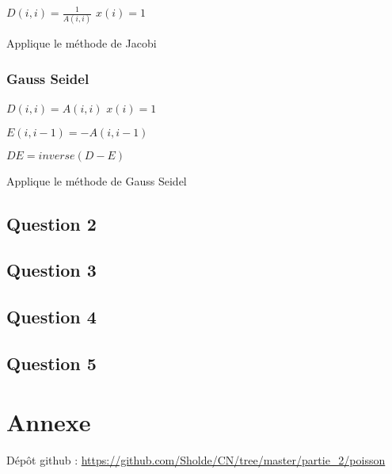 \documentclass[11pt]{article}
\DeclarePairedDelimiter{\norm}{\lVert}{\rVert}
\begin{document}
\begin{algorithm} [H]
  \SetAlgoLined
  
   {
    $D(i,i) = \frac{1}{A(i, i)}$\;
    $x(i) = 1$\;
  }
  

  \caption{Applique le méthode de Jacobi}
\end{algorithm}

\subsubsection{Gauss Seidel}

\begin{algorithm} [H]
  \SetAlgoLined
  
   {
    $D(i,i) = A(i, i)$\;
    $x(i) = 1$\;
  }

   {
    $E(i,i - 1) = - A(i, i - 1)$\;
  }

  $DE = inverse(D - E)$\; 


  \caption{Applique le méthode de Gauss Seidel}
\end{algorithm}

\subsection{Question 2}

\subsection{Question 3}

\subsection{Question 4}

\subsection{Question 5}

\section{Annexe}

Dépôt github : \url{https://github.com/Sholde/CN/tree/master/partie_2/poisson}
\end{document}
